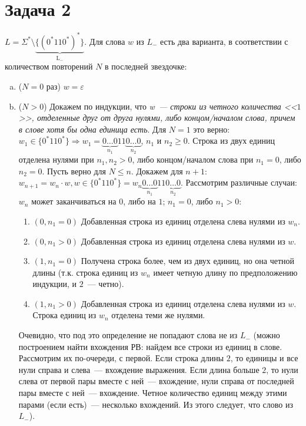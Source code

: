 \documentclass[a4paper]{article}
\begin{document}
\section*{Задача 2}
$L=\Sigma^*\setminus{\underbrace{{\{ (0^*110^*)^* \}}}_\mathrm{{L}_{-}}}$. Для слова $w$ из ${L}_{-}$ есть два варианта, в соответствии с количеством повторений $N$ в последней звездочке:
\begin{enumerate}[a.]
\item ($N=0$ раз) $w=\varepsilon$
\item ($N>0$) Докажем по индукции, что \emph{w~--- строки из четного количества <<$1$>>, отделенные друг от друга нулями, либо концом/началом слова, причем в слове хотя бы одна единица есть}.\newline
Для $N=1$ это верно: $w_1\in \{0^*110^*\}\Rightarrow w_1=\underbrace{0\dots 0}_{n_1}11\underbrace{0\dots 0}_{n_2}$, $n_1$ и $n_2 \geqslant 0$. Строка из двух единиц отделена нулями при $n_1,n_2>0$, либо концом/началом слова при $n_1=0$, либо $n_2=0$.\newline
Пусть верно для $N\leqslant n$. Докажем для $n+1$: $w_{n+1}=w_n\cdot w, w\in \{0^*110^*\}=w_n\underbrace{0\dots 0}_{n_1}11\underbrace{0\dots 0}_{n_2}$. Рассмотрим различные случаи: $w_n$ может заканчиваться на $0$, либо на $1$; $n_1=0$, либо $n_1>0$:
\begin{enumerate}[1.]
\item $(0,n_1=0)$ Добавленная строка из единиц отделена слева нулями из $w_n$.
\item $(0,n_1>0)$ Добавленная строка из единиц отделена слева нулями из $w$.
\item $(1,n_1=0)$ Получена строка более, чем из двух единиц, но она четной длины (т.к. строка единиц из $w_n$ имеет четную длину по предположению индукции, и $2$~--- четно).
\item $(1,n_1>0)$ Добавленная строка из единиц отделена слева нулями из $w$. Строка единиц из $w_n$ отделена теми же нулями.
\end{enumerate}
Очевидно, что под это определение не попадают слова не из $L_-$ (можно построением найти вхождения РВ: найдем все строки из единиц в слове. Рассмотрим их по-очереди, с первой. Если строка длины $2$, то единицы и все нули справа и слева~--- вхождение выражения. Если длина больше $2$, то нули слева от первой пары вместе с ней~--- вхождение, нули справа от последней пары вместе с ней~--- вхождение. Четное количество единиц между этими парами (если есть)~--- несколько вхождений. Из этого следует, что слово из $L_-$).
\end{enumerate}
\end{document}
